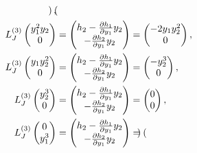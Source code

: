 \documentclass[12pt]{report}
\begin{document}
\begin{solution}
\begin{align*}
\begin{pmatrix}
        \end{pmatrix},\\
        L_J^{(3)}
        \begin{pmatrix} 
            y_1^2y_2\\0 
        \end{pmatrix} &= 
        \begin{pmatrix}
            h_2 - \frac{\partial h_1}{\partial y_1}y_2\\
            -\frac{\partial h_2}{\partial y_1} y_2
        \end{pmatrix} = \begin{pmatrix}
            -2y_1y_2^2\\0
        \end{pmatrix},\\
        L_J^{(3)}
        \begin{pmatrix} 
            y_1y_2^2\\0 
        \end{pmatrix} &= 
        \begin{pmatrix}
            h_2 - \frac{\partial h_1}{\partial y_1}y_2\\
            -\frac{\partial h_2}{\partial y_1} y_2
        \end{pmatrix} = \begin{pmatrix}
            -y_2^3\\0
        \end{pmatrix},\\
        L_J^{(3)}
        \begin{pmatrix} 
            y_2^3\\0 
        \end{pmatrix} &= 
        \begin{pmatrix}
            h_2 - \frac{\partial h_1}{\partial y_1}y_2\\
            -\frac{\partial h_2}{\partial y_1} y_2
        \end{pmatrix} = \begin{pmatrix}
            0 \\ 0
        \end{pmatrix},\\
        L_J^{(3)}
        \begin{pmatrix} 
            0\\y_1^3
        \end{pmatrix} &= 
        \begin{pmatrix}
            h_2 - \frac{\partial h_1}{\partial y_1}y_2\\
            -\frac{\partial h_2}{\partial y_1} y_2
        \end{pmatrix} = \begin{pmatrix}

\end{pmatrix}
\end{align*}
\end{solution}
\end{document}
